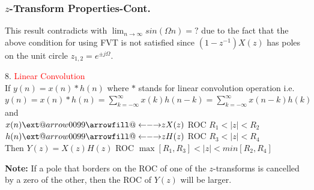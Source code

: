 \documentclass[mathserif, 10pt]{beamer} %
\makeatletter
\newcommand\xleftrightarrow[2][]{\ext@arrow 0099{\longleftrightarrowfill@}{#1}{#2}}
\def\longleftrightarrowfill@{\arrowfill@\leftarrow\relbar\rightarrow}
\makeatother
\begin{document}
\frame
{
\frametitle{$z$-Transform Properties-Cont.}

This result contradicts with $\lim_{n \to \infty} sin( \Omega n)=? $
due to the fact that the above condition for using FVT is not satisfied since $(1-z^{-1})X(z)$ has poles on the unit circle  $z_{1,2}= e^{\pm j \Omega}$.   \vspace{.15in}


8. \textcolor{red} {Linear Convolution}\\ \vspace{.2in}
If $y(n) = x(n)*h(n)$ where $*$ stands for linear convolution operation i.e. $y(n) = x(n)*h(n)=\sum\limits_{k=- \infty}^{\infty} x(k) h(n-k) = \sum\limits_{k=- \infty}^{\infty} x(n-k)h(k)$\\
and\\
$x(n) \xleftrightarrow[]{z} X(z) $  \hspace{0.2in} ROC  $R_1<|z|<R_2$\\
$h(n) \xleftrightarrow[]{z} H(z) $ \hspace{0.2in} ROC  $R_3<|z|<R_4$\\ \vspace{.2in}
Then $Y(z) = X(z)H(z) $ \hspace{0.2in} ROC $\max[R_1,R_3]<|z|<min[R_2,R_4]$\\ \vspace{.1in}

\textbf{Note:} If a pole that borders on the ROC of one of the $z$-transforms is cancelled by a zero of the other, then the ROC of $Y(z)$ will be larger.




}
\end{document}
